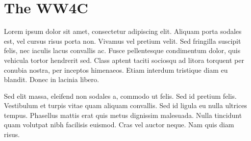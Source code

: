 \documentclass[usenatbib]{mn2e}
\begin{document}
    




\section{The WW4C}
Lorem ipsum dolor sit amet, consectetur adipiscing elit. Aliquam porta sodales est, vel cursus risus porta non. Vivamus vel pretium velit. Sed fringilla suscipit felis, nec iaculis lacus convallis ac. Fusce pellentesque condimentum dolor, quis vehicula tortor hendrerit sed. Class aptent taciti sociosqu ad litora torquent per conubia nostra, per inceptos himenaeos. Etiam interdum tristique diam eu blandit. Donec in lacinia libero.

Sed elit massa, eleifend non sodales a, commodo ut felis. Sed id pretium felis. Vestibulum et turpis vitae quam aliquam convallis. Sed id ligula eu nulla ultrices tempus. Phasellus mattis erat quis metus dignissim malesuada. Nulla tincidunt quam volutpat nibh facilisis euismod. Cras vel auctor neque. Nam quis diam risus.
\end{document}
